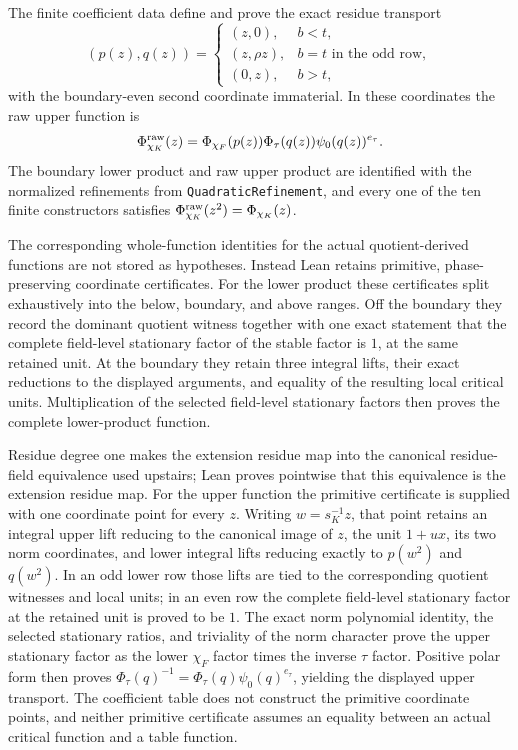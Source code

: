 \begin{definition}
The finite coefficient data define and prove the exact residue transport
\[
 (p(z),q(z))=
 \begin{cases}
 (z,0),&b<t,\\
 (z,\rho z),&b=t\text{ in the odd row},\\
 (0,z),&b>t,
 \end{cases}
\]
with the boundary-even second coordinate immaterial.  In these coordinates
the raw upper function is
\[
 \Phi_{\chi_K}^{\rm raw}(z)=
 \Phi_{\chi_F}(p(z))\Phi_\tau(q(z))
 \psi _0(q(z))^{e_\tau}.
\]
The boundary lower product and raw upper product are identified with the
normalized refinements from \texttt{QuadraticRefinement}, and every one of the
ten finite constructors satisfies
\(\Phi_{\chi_K}^{\rm raw}(z^2)=\Phi_{\chi_K}(z)\).

The corresponding whole-function identities for the actual quotient-derived
functions are not stored as hypotheses.  Instead Lean retains primitive,
phase-preserving coordinate certificates.  For the lower product these
certificates split exhaustively into the below, boundary, and above ranges.
Off the boundary
they record the dominant quotient witness together with one exact statement
that the complete field-level stationary factor of the stable factor is
\(1\), at the same retained unit.  At the boundary they retain three integral
lifts, their exact reductions to the displayed arguments, and equality of
the resulting local critical units.  Multiplication of the selected
field-level stationary factors then proves the complete lower-product
function.

Residue degree one makes the extension residue map into the canonical
residue-field equivalence used upstairs; Lean proves pointwise that this
equivalence is the extension residue map.  For the upper function the
primitive certificate is supplied with one coordinate point for every
\(z\).  Writing \(w=s_K^{-1}z\), that point retains an integral upper lift
reducing to the canonical image of \(z\), the unit \(1+ux\), its two norm
coordinates, and lower integral lifts reducing exactly to \(p(w^2)\) and
\(q(w^2)\).  In an odd lower row those lifts are tied to the corresponding
quotient witnesses and local units; in an even row the complete field-level
stationary factor at the retained unit is proved to be \(1\).  The exact norm
polynomial identity, the selected stationary ratios, and triviality of the
norm character prove the upper stationary factor as the lower \(\chi_F\)
factor times the inverse \(\tau\) factor.  Positive polar form then proves
\(\Phi_\tau(q)^{-1}=\Phi_\tau(q)\psi_0(q)^{e_\tau}\), yielding the displayed
upper transport.  The coefficient table does not construct the primitive
coordinate points, and neither primitive certificate assumes an equality
between an actual critical function and a table function.


\end{definition}
